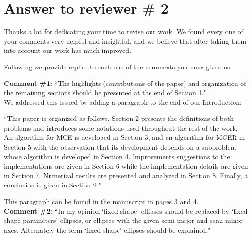 
		
%
		
		\section*{Answer to reviewer \# 2}
		Thanks a lot for dedicating your time to revise our work. We found every one of your comments very helpful and insightful, and we believe that after taking them into account our work has much improved.
		
		Following we provide replies to each one of the comments you have given us:
		
		\textbf{Comment \#1:} ``The highlights (contributions of the paper) and organization of the remaining sections should be presented at the end of Section 1."
		\\
		
		We addressed this issued by adding a paragraph to the end of our Introduction:
		
		``This paper is organized as follows. Section 2 presents the definitions of both problems and introduces some notations used throughout the rest of the work. An algorithm for MCE is developed
		in Section 3, and an algorithm for MCER in Section 5 with the observation that its development
		depends on a subproblem whose algorithm is developed in Section 4. Improvements suggestions to
		the implementations are given in Section 6 while the implementation details are given in Section 7.
		Numerical results are presented and analyzed in Section 8. Finally, a conclusion is given in Section 9."
		
		This paragraph can be found in the manuscript in pages 3 and 4.
		\\
		
		\textbf{Comment \#2:} ``In my opinion `fixed shape' ellipses should be replaced by `fixed shape parameters' ellipses, or ellipses with the given semi-major and semi-minor axes. Alternately the term `fixed shape' ellipses should be explained."
		\\
		
